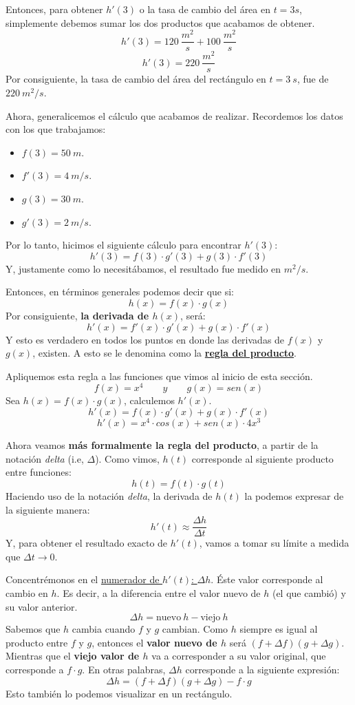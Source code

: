 \documentclass[12pt]{article}
\begin{document}
Entonces, para obtener $h'(3)$ o la tasa de cambio del área en $t = 3s$, simplemente debemos sumar los dos productos que acabamos de obtener.
\[h'(3) = 120 \ \frac{m^{2}}{s} + 100 \ \frac{m^{2}}{s}\]
\[h'(3) = 220 \ \frac{m^{2}}{s}\]
Por consiguiente, la tasa de cambio del área del rectángulo en $t = 3 \ s$, fue de $220 \ m^{2}/s$.

Ahora, generalicemos el cálculo que acabamos de realizar. Recordemos los datos con los que trabajamos:

\begin{itemize}
\item $f(3) = 50 \ m$.
\item $f'(3) = 4 \ m/s$.
\item $g(3) = 30 \ m$.
\item $g'(3) = 2 \ m/s$.
\end{itemize}

Por lo tanto, hicimos el siguiente cálculo para encontrar $h'(3)$:
\[h'(3) = f(3) \cdot g'(3) + g(3) \cdot f'(3)\]
Y, justamente como lo necesitábamos, el resultado fue medido en $m^{2}/s$.

Entonces, en términos generales podemos decir que si:
\[h(x) = f(x) \cdot g(x)\]
Por consiguiente, \textbf{la derivada de $h(x)$}, será:
\[h'(x) = f'(x) \cdot g'(x) + g(x) \cdot f'(x)\]
Y esto es verdadero en todos los puntos en donde las derivadas de $f(x)$ y $g(x)$, existen. A esto se le denomina como la \textbf{\underline{regla del producto}}.

Apliquemos esta regla a las funciones que vimos al inicio de esta sección.
\[f(x) = x^{4} \qquad y \qquad g(x) = sen(x)\]
Sea $h(x) = f(x) \cdot g(x)$, calculemos $h'(x)$.
\[h'(x) = f(x) \cdot g'(x) + g(x) \cdot f'(x)\]
\[h'(x) = x^{4} \cdot cos(x) + sen(x) \cdot 4x^{3}\]

Ahora veamos \textbf{más formalmente la regla del producto}, a partir de la notación \textit{delta} (i.e, $\Delta$). Como vimos, $h(t)$ corresponde al siguiente producto entre funciones:
\[h(t) = f(t) \cdot g(t)\]
Haciendo uso de la notación \textit{delta}, la derivada de $h(t)$ la podemos expresar de la siguiente manera:
\[h'(t) \approx \frac{\Delta h}{\Delta t}\]
Y, para obtener el resultado exacto de $h'(t)$, vamos a tomar su límite a medida que $\Delta t \to 0$.

Concentrémonos en el \underline{numerador de $h'(t)$: $\Delta h$}. Éste valor corresponde al cambio en $h$. Es decir, a la diferencia entre el valor nuevo de $h$ (el que cambió) y su valor anterior.
\[\Delta h = \mathrm{nuevo} \ h - \mathrm{viejo} \ h\]
Sabemos que $h$ cambia cuando $f$ y $g$ cambian. Como $h$ siempre es igual al producto entre $f$ y $g$, entonces el \textbf{valor nuevo de $h$} será $(f + \Delta f)(g + \Delta g)$. Mientras que el \textbf{viejo valor de $h$} va a corresponder a su valor original, que corresponde a $f \cdot g$. En otras palabras, $\Delta h$ corresponde a la siguiente expresión:
\[\Delta h = (f + \Delta f)(g + \Delta g) - f \cdot g\]
Esto también lo podemos visualizar en un rectángulo.
\end{document}

